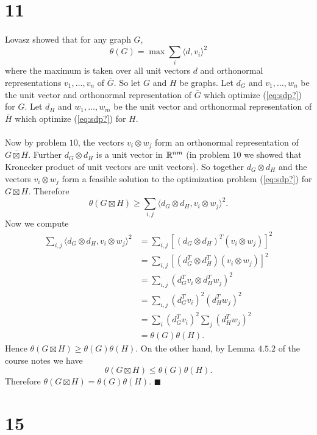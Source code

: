 \documentclass[letterpaper,12pt,oneside,onecolumn]{article}
\newcommand{\1}{\mathbbm{1}}
\begin{document}
\section*{11}
\paragraph{}
Lovasz showed that for any graph $G$,
\begin{equation}\theta(G) = \max \sum_{i} \langle d, v_i\rangle ^2\label{eq:sdp?} \end{equation}
where the maximum is taken over all unit vectors $d$ and orthonormal representations $v_1, \dots, v_n$ of $\overline{G}$. So let $G$ and $H$ be graphs. Let $d_G$ and $v_1, \dots, w_n$ be the unit vector and orthonormal representation of $\overline{G}$ which optimize (\ref{eq:sdp?}) for $G$. Let $d_H$ and $w_1, \dots, w_m$ be the unit vector and orthonormal representation of $\overline{H}$ which optimize (\ref{eq:sdp?}) for $H$.
\paragraph{}
Now by problem $10$, the vectors $v_i \otimes w_j$ form an orthonormal representation of $\overline{G \boxtimes H}$. Further $d_G \otimes d_H$ is a unit vector in $\mathbb{R}^{nm}$ (in problem $10$ we showed that Kronecker product of unit vectors are unit vectors). So together $d_G \otimes d_H$ and the vectors $v_i \otimes w_j$ form a feasible solution to the optimization problem (\ref{eq:sdp?}) for $G \boxtimes H$. Therefore
$$\theta(G\boxtimes H) \geq \sum_{i,j} \langle d_G\otimes d_H, v_i \otimes w_j \rangle^2.$$
Now we compute
\begin{align*}
\sum_{i,j} \langle d_G\otimes d_H, v_i \otimes w_j \rangle^2  &= \sum_{i,j}[(d_G\otimes d_H)^T(v_i \otimes w_j)]^2 \\
&= \sum_{i,j}[(d_G^T \otimes d_H^T)(v_i \otimes w_j)]^2 \\
&= \sum_{i,j}(d_G^Tv_i \otimes d_H^Tw_j)^2 \\
&= \sum_{i,j}(d_G^Tv_i)^2 (d_H^Tw_j)^2 \\
&= \sum_i (d_G^Tv_i)^2 \sum_j (d_H^Tw_j)^2\\
&= \theta(G)\theta(H).
\end{align*}
Hence $\theta(G\boxtimes H) \geq \theta(G)\theta(H)$. On the other hand, by Lemma $4.5.2$ of the course notes we have
$$\theta(G\boxtimes H) \leq \theta(G) \theta(H).$$
Therefore $\theta(G \boxtimes H) = \theta(G) \theta(H)$. $\blacksquare$
\section*{15}
\end{document}
